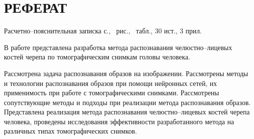 \section*{РЕФЕРАТ}

Расчетно--пояснительная записка \pageref{LastPage} с., \totalfigures\ рис., \totaltables\ табл., 30 ист., 3 прил.

В работе представлена разработка метода распознавания челюстно--лицевых костей черепа по томографическим снимкам головы человека.

Рассмотрена задача распознавания образов на изображении. Рассмотрены методы и технологии распознавания образов при помощи нейронных сетей, их применимость при работе с томографическими снимками. Рассмотрены сопутствующие методы и подходы при реализации метода распознавания образов. Представлена реализация метода распознавания челюстно--лицевых костей черепа человека, проведены исследования эффективности разработанного метода на различных типах томографических снимков.